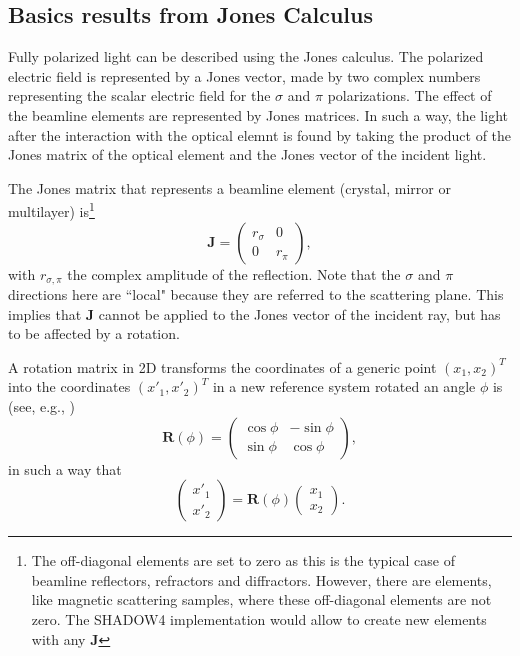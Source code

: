 \documentclass{iucr}
\begin{document}
\subsection{Basics results from Jones Calculus}
\label{sec:Jones}

Fully polarized light can be described using the Jones calculus. The polarized electric field is represented by a Jones vector, made by two complex numbers representing the scalar electric field for the $\sigma$ and $\pi$ polarizations. 
The effect of the beamline elements are represented by Jones matrices.
In such a way, the light after the interaction with the optical elemnt is found by taking the product of the Jones matrix of the optical element and the Jones vector of the incident light. 

The Jones matrix that represents a beamline element (crystal, mirror or multilayer) is\footnote{The off-diagonal elements are set to zero as this is the typical case of beamline reflectors, refractors and diffractors. However, there are elements, like magnetic scattering samples, where these off-diagonal elements are not zero. The SHADOW4 implementation would allow to create new elements with any $\textbf{J}$}
\begin{equation}\label{eq:J}
\textbf{J} = 
\begin{pmatrix}
r_\sigma & 0\\
0 & r_\pi
\end{pmatrix},
\end{equation}
with $r_{\sigma,\pi}$ the complex amplitude of the reflection.
Note that the $\sigma$ and $\pi$ directions here are ``local" because they are referred to the scattering plane. This implies that $\textbf{J}$ cannot be applied to the Jones vector of the incident ray, but has to be affected by a rotation. 

A rotation matrix in 2D transforms the coordinates of a generic point $(x_1,x_2)^T$ into the coordinates $(x'_1,x'_2)^T$ in a new reference system rotated an angle $\phi$ is (see, e.g., \cite{LeClair})
\begin{equation}
\textbf{R}(\phi) = 
\begin{pmatrix}
\cos\phi & -\sin\phi\\
\sin\phi & \cos\phi
\end{pmatrix},
\end{equation}
in such a way that
\begin{equation}
\begin{pmatrix}
x'_1 \\
x'_2
\end{pmatrix} = 
\textbf{R}(\phi)
\begin{pmatrix}
x_1 \\
x_2
\end{pmatrix}.
\end{equation}
\end{document}
